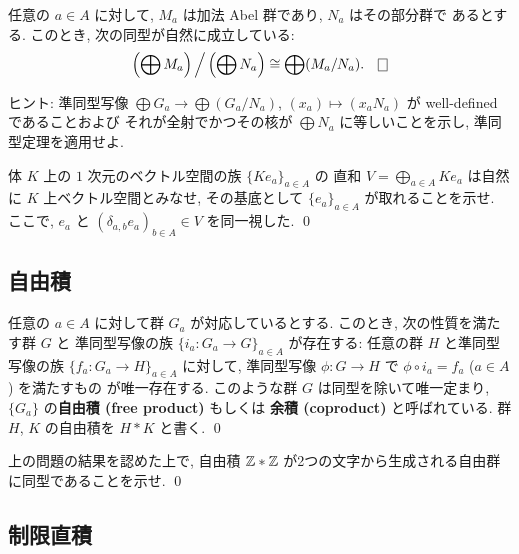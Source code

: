 \documentclass[12pt,twoside]{jarticle}
\def\Z{{\Bbb Z}} %
\def\isom{\cong}
\begin{document}
\begin{question}[剰余群を取る操作と直和の可換性]
  任意の $a\in A$ に対して, $M_a$ は加法 Abel 群であり, $N_a$ はその部分群で
  あるとする. このとき, 次の同型が自然に成立している:
  \begin{equation*}
    \left(\bigoplus M_a\right)\Big/ \left(\bigoplus N_a \right)
    \isom \bigoplus (M_a/N_a).
    \qed
  \end{equation*}
\end{question}

\noindent ヒント: 準同型写像 $\bigoplus G_a \to \bigoplus (G_a/N_a)$, 
$(x_a)\mapsto(x_aN_a)$ が well-defined であることおよび
それが全射でかつその核が $\bigoplus N_a$ に等しいことを示し,
準同型定理を適用せよ.

\begin{question}
  体 $K$ 上の $1$ 次元のベクトル空間の族 $\{K e_a\}_{a\in A}$ の
  直和 $V = \bigoplus_{a\in A} K e_a$ は自然に $K$ 上ベクトル空間とみなせ,
  その基底として $\{e_a\}_{a\in A}$ が取れることを示せ.
  ここで, $e_a$ と $(\delta_{a,b}e_a)_{b\in A}\in V$ を同一視した.  
  \qed
\end{question}


\subsection{自由積}
\label{sec:free-product}

\begin{question}[自由積]
  任意の $a\in A$ に対して群 $G_a$ が対応しているとする.
  このとき, 次の性質を満たす群 $G$ と
  準同型写像の族 $\{i_a:G_a\to G\}_{a\in A}$ が存在する: 
  任意の群 $H$ と準同型写像の族 $\{f_a:G_a\to H\}_{a\in A}$ に対して,
  準同型写像 $\phi:G\to H$ で $\phi\circ i_a = f_a$ ($a\in A$) を満たすもの
  が唯一存在する.
  このような群 $G$ は同型を除いて唯一定まり, $\{G_a\}$ の{\bf 自由積 (free
  product)} もしくは {\bf 余積 (coproduct)} と呼ばれている.
  群 $H$, $K$ の自由積を $H*K$ と書く.
  \qed
\end{question}

\begin{question}
  上の問題の結果を認めた上で, 自由積 $\Z*\Z$ が2つの文字から生成される自由群
  に同型であることを示せ. \qed
\end{question}


\subsection{制限直積}
\label{sec:restricted-product}
\end{document}
